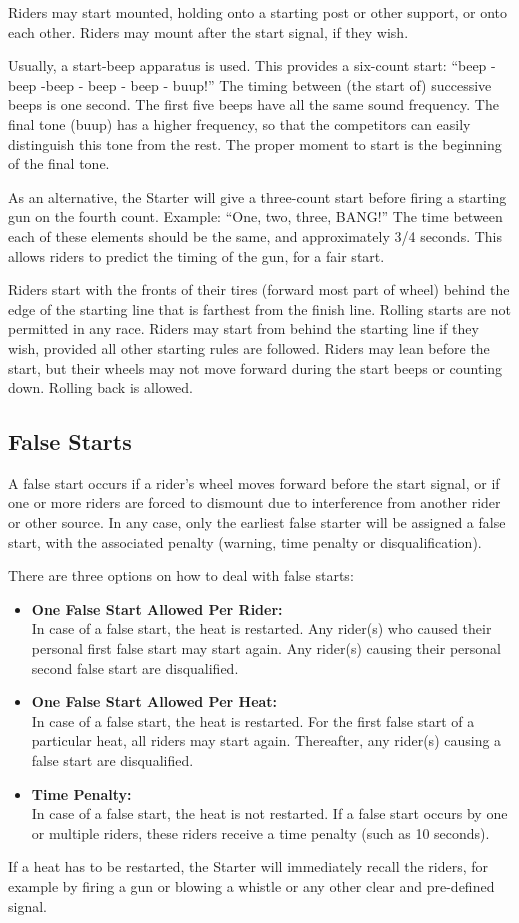 Riders may start mounted, holding onto a starting post or other support, or onto each other.
Riders may mount after the start signal, if they wish.

Usually, a start-beep apparatus is used.
This provides a six-count start: ``beep - beep -beep - beep - beep - buup!''
The timing between (the start of) successive beeps is one second.
The first five beeps have all the same sound frequency.
The final tone (buup) has a higher frequency, so that the competitors can easily distinguish this tone from the rest.
The proper moment to start is the beginning of the final tone.

As an alternative, the Starter will give a three-count start before firing a starting gun on the fourth count.
Example: ``One, two, three, BANG!''
The time between each of these elements should be the same, and approximately 3/4 seconds.
This allows riders to predict the timing of the gun, for a fair start.

Riders start with the fronts of their tires (forward most part of wheel) behind the edge of the starting line that is farthest from the finish line.
Rolling starts are not permitted in any race.
Riders may start from behind the starting line if they wish, provided all other starting rules are followed.
Riders may lean before the start, but their wheels may not move forward during the start beeps or counting down.
Rolling back is allowed.

\subsection{False Starts}

A false start occurs if a rider's wheel moves forward before the start signal, or if one or more riders are forced to dismount due to interference from another rider or other source.
In any case, only the earliest false starter will be assigned a false start, with the associated penalty (warning, time penalty or disqualification).

There are three options on how to deal with false starts:
\begin{itemize}
\item \textbf{One False Start Allowed Per Rider:}\\
In case of a false start, the heat is restarted.
Any rider(s) who caused their personal first false start may start again.
Any rider(s) causing their personal second false start are disqualified.
\item \textbf{One False Start Allowed Per Heat:}\\
In case of a false start, the heat is restarted.
For the first false start of a particular heat, all riders may start again.
Thereafter, any rider(s) causing a false start are disqualified.
\item \textbf{Time Penalty:}\\
In case of a false start, the heat is not restarted.
If a false start occurs by one or multiple riders, these riders receive a time penalty (such as 10 seconds).
\end{itemize}
If a heat has to be restarted, the Starter will immediately recall the riders, for example by firing a gun or blowing a whistle or any other clear and pre-defined signal.

